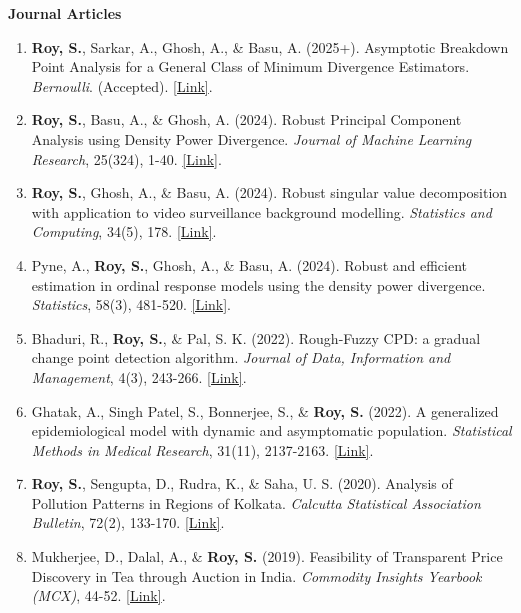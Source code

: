 \documentclass[10pt]{developercv} %
\begin{document}

\textbf{Journal Articles}
\begin{enumerate}
    \item \textbf{Roy, S.}, Sarkar, A., Ghosh, A., \& Basu, A. (2025+). Asymptotic Breakdown Point Analysis for a General Class of Minimum Divergence Estimators. \emph{Bernoulli}. (Accepted). \href{https://www.e-publications.org/ims/submission/BEJ/user/submissionFile/65827?confirm=911f0874}{[Link]}.
    \item \textbf{Roy, S.}, Basu, A., \& Ghosh, A. (2024). Robust Principal Component Analysis using Density Power Divergence. \emph{Journal of Machine Learning Research}, 25(324), 1-40. \href{https://www.jmlr.org/papers/v25/23-1096.html}{[Link]}.
    \item \textbf{Roy, S.}, Ghosh, A., \& Basu, A. (2024). Robust singular value decomposition with application to video surveillance background modelling. \emph{Statistics and Computing}, 34(5), 178. \href{https://link.springer.com/article/10.1007/s11222-024-10493-7}{[Link]}.
    \item Pyne, A., \textbf{Roy, S.}, Ghosh, A., \& Basu, A. (2024). Robust and efficient estimation in ordinal response models using the density power divergence. \emph{Statistics}, 58(3), 481-520. \href{https://www.tandfonline.com/doi/abs/10.1080/02331888.2024.2347329}{[Link]}.        
    \item Bhaduri, R., \textbf{Roy, S.}, \& Pal, S. K. (2022). Rough-Fuzzy CPD: a gradual change point detection algorithm. \emph{Journal of Data, Information and Management}, 4(3), 243-266. \href{https://link.springer.com/article/10.1007/s42488-022-00077-3}{[Link]}.
    \item Ghatak, A., Singh Patel, S., Bonnerjee, S., \& \textbf{Roy, S.} (2022). A generalized epidemiological model with dynamic and asymptomatic population. \emph{Statistical Methods in Medical Research}, 31(11), 2137-2163. \href{https://journals.sagepub.com/doi/abs/10.1177/09622802221115877}{[Link]}.
    \item \textbf{Roy, S.}, Sengupta, D., Rudra, K., \& Saha, U. S. (2020). Analysis of Pollution Patterns in Regions of Kolkata. \emph{Calcutta Statistical Association Bulletin}, 72(2), 133-170. \href{https://journals.sagepub.com/doi/abs/10.1177/0008068320976781}{[Link]}.
    \item Mukherjee, D., Dalal, A., \& \textbf{Roy, S.} (2019). Feasibility of Transparent Price Discovery in Tea through Auction in India. \emph{Commodity Insights Yearbook (MCX)}, 44-52. \href{https://www.mcxindia.com/docs/default-source/about-us/commodity-insights-yearbook/2019/02-emerging-trends/feasibility-of-transparent-price-discovery-in-tea-through-auction-in-india-dr-diganta-mukherjee-mr-abhinandan-dalal-and-mr-subhrajyoty-roy.pdf}{[Link]}.
\end{enumerate}
\end{document}
